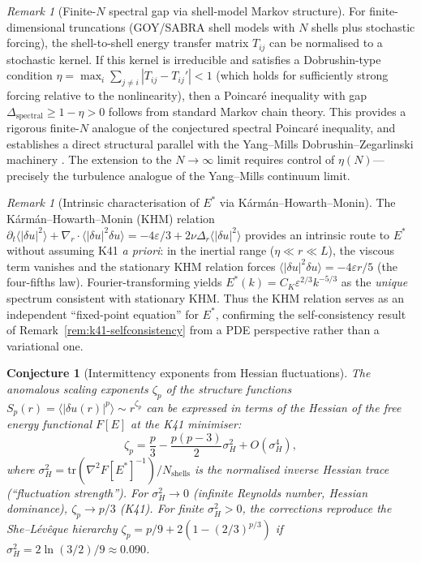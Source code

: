 \documentclass[12pt,a4paper]{article}
\theoremstyle{definition}
\theoremstyle{plain}
\newtheorem{conjecture}[definition]{Conjecture}
\theoremstyle{remark}
\newtheorem{remark}[definition]{Remark}
\begin{document}
\begin{remark}[Finite-$N$ spectral gap via shell-model Markov structure]\label{rem:finite-N-gap}
For finite-dimensional truncations (GOY/SABRA shell models with $N$ shells plus stochastic forcing), the shell-to-shell energy transfer matrix $T_{ij}$ can be normalised to a stochastic kernel. If this kernel is irreducible and satisfies a Dobrushin-type condition $\eta = \max_i \sum_{j \neq i} |T_{ij} - T_{ij}'| < 1$ (which holds for sufficiently strong forcing relative to the nonlinearity), then a Poincar\'e inequality with gap $\Delta_{\mathrm{spectral}} \geq 1 - \eta > 0$ follows from standard Markov chain theory. This provides a rigorous finite-$N$ analogue of the conjectured spectral Poincar\'e inequality, and establishes a direct structural parallel with the Yang--Mills Dobrushin--Zegarlinski machinery \cite{Geiger2026-YM}. The extension to the $N \to \infty$ limit requires control of $\eta(N)$---precisely the turbulence analogue of the Yang--Mills continuum limit.
\end{remark}

\begin{remark}[Intrinsic characterisation of $E^*$ via K\'arm\'an--Howarth--Monin]
\label{rem:khm-intrinsic}
The K\'arm\'an--Howarth--Monin (KHM) relation $\partial_t \langle |\delta u|^2 \rangle + \nabla_r \cdot \langle |\delta u|^2 \delta u \rangle = -4\varepsilon/3 + 2\nu \Delta_r \langle |\delta u|^2 \rangle$ provides an intrinsic route to $E^*$ without assuming K41 \emph{a priori}: in the inertial range ($\eta \ll r \ll L$), the viscous term vanishes and the stationary KHM relation forces $\langle |\delta u|^2 \delta u \rangle = -4\varepsilon r / 5$ (the four-fifths law). Fourier-transforming yields $E^*(k) = C_K \varepsilon^{2/3} k^{-5/3}$ as the \emph{unique} spectrum consistent with stationary KHM. Thus the KHM relation serves as an independent ``fixed-point equation'' for $E^*$, confirming the self-consistency result of Remark~\ref{rem:k41-selfconsistency} from a PDE perspective rather than a variational one.
\end{remark}

\begin{conjecture}[Intermittency exponents from Hessian fluctuations]
\label{conj:intermittency-hessian}
The anomalous scaling exponents $\zeta_p$ of the structure functions $S_p(r) = \langle |\delta u(r)|^p \rangle \sim r^{\zeta_p}$ can be expressed in terms of the Hessian of the free energy functional $F[E]$ at the K41 minimiser:
\[
\zeta_p = \frac{p}{3} - \frac{p(p-3)}{2} \sigma_H^2 + O(\sigma_H^4),
\]
where $\sigma_H^2 = \mathrm{tr}(\nabla^2 F[E^*]^{-1}) / N_{\mathrm{shells}}$ is the normalised inverse Hessian trace (``fluctuation strength''). For $\sigma_H^2 \to 0$ (infinite Reynolds number, Hessian dominance), $\zeta_p \to p/3$ (K41). For finite $\sigma_H^2 > 0$, the corrections reproduce the She--L\'ev\^eque hierarchy $\zeta_p = p/9 + 2(1 - (2/3)^{p/3})$ if $\sigma_H^2 = 2\ln(3/2)/9 \approx 0.090$.
\end{conjecture}
\end{document}
